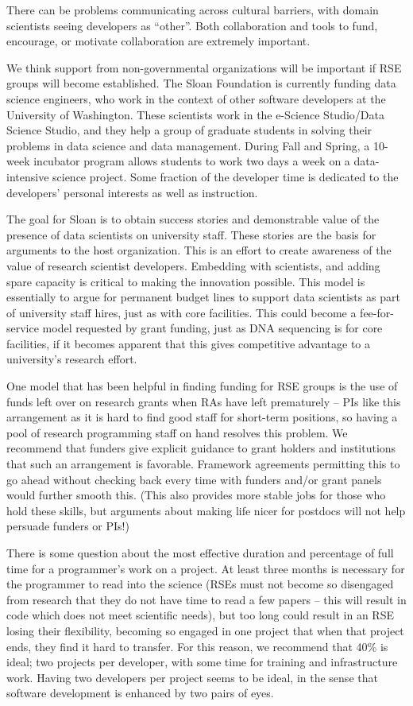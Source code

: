 There can be problems communicating across cultural barriers, with domain
scientists seeing developers as ``other''. Both collaboration and tools to fund,
encourage, or motivate collaboration are extremely important. 

We think support from non-governmental organizations will be important if RSE
groups will become established. The Sloan Foundation is currently funding data
science engineers, who work in the context of other software developers at the
University of Washington. These scientists work in the e-Science Studio/Data
Science Studio, and they help a group of graduate students in solving their
problems in data science and data management. During Fall and Spring, a 10-week
incubator program allows students to work two days a week on a data-intensive
science project. Some fraction of the developer time is dedicated to the
developers' personal interests as well as instruction.

The goal for Sloan is to obtain success stories and demonstrable value
of the presence of data scientists on university staff. These stories are the
basis for arguments to the host organization. This is an effort to create
awareness of the value of research scientist developers. Embedding with
scientists, and adding spare capacity is critical to making the innovation
possible. This model is essentially to argue for permanent budget lines to
support data scientists as part of university staff hires, just as with core
facilities. This could become a fee-for-service model requested by grant
funding, just as DNA sequencing is for core facilities, if it becomes apparent
that this gives competitive advantage to a university's research effort.

One model that has been helpful in finding funding for RSE groups is the use of
funds left over on research grants when RAs have left prematurely -- PIs like
this arrangement as it is hard to find good staff for short-term positions, so
having a pool of research programming staff on hand resolves this problem. We
recommend that funders give explicit guidance to grant holders and institutions
that such an arrangement is favorable. Framework agreements permitting this to go
ahead without checking back every time with funders and/or grant panels would
further smooth this. (This also provides more stable jobs for those who hold
these skills, but arguments about making life nicer for postdocs will not help
persuade funders or PIs!)

There is some question about the most effective duration and percentage of full
time for a programmer's work on a project. At least three months is necessary
for the programmer to read into the science (RSEs must not become so disengaged
from research that they do not have time to read a few papers -- this will result
in code which does not meet scientific needs), but too long could result in an
RSE losing their flexibility, becoming so engaged in one project that when that
project ends, they find it hard to transfer. For this reason, we recommend
that 40\% is ideal; two projects per developer, with some time for
training and infrastructure work. Having two developers per project seems to be ideal,
in the sense that software development is enhanced by two pairs of eyes.

